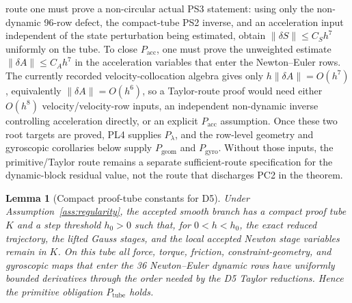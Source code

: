 \documentclass[preprint,12pt]{elsarticle}
\newtheorem{lemma}{Lemma}
\begin{document}
route one must prove a non-circular actual PS3 statement: using only the
non-dynamic 96-row defect, the compact-tube PS2 inverse, and an acceleration
input independent of the state perturbation being estimated, obtain
\(\|\delta S\|\le C_Sh^7\) uniformly on the tube.  To close
\(P_{\mathrm{acc}}\), one must prove the unweighted estimate
\(\|\delta A\|\le C_Ah^7\) in the acceleration variables that enter the
Newton--Euler rows.  The currently recorded velocity-collocation algebra gives
only \(h\|\delta A\|=O(h^7)\), equivalently \(\|\delta A\|=O(h^6)\), so a
Taylor-route proof would need either \(O(h^8)\) velocity/velocity-row inputs,
an independent non-dynamic inverse controlling acceleration directly, or an
explicit \(P_{\mathrm{acc}}\) assumption.  Once these two root targets are
proved, PL4 supplies \(P_{\lambda}\), and the row-level geometry and
gyroscopic corollaries below supply \(P_{\mathrm{geom}}\) and
\(P_{\mathrm{gyro}}\).  Without those inputs, the primitive/Taylor route remains a
separate sufficient-route specification for the dynamic-block residual value,
not the route that discharges PC2 in the theorem.

\begin{lemma}[Compact proof-tube constants for D5]
\label{lem:d5-compact-tube-constants}
Under Assumption~\ref{ass:regularity}, the accepted smooth branch has a
compact proof tube \(K\) and a step threshold \(h_0>0\) such that, for
\(0<h<h_0\), the exact reduced trajectory, the lifted Gauss stages, and the
local accepted Newton stage variables remain in \(K\).  On this tube all
force, torque, friction, constraint-geometry, and gyroscopic maps that enter
the 36 Newton--Euler dynamic rows have uniformly bounded derivatives through
the order needed by the D5 Taylor reductions.  Hence the primitive obligation
\(P_{\mathrm{tube}}\) holds.
\end{lemma}
\end{document}
